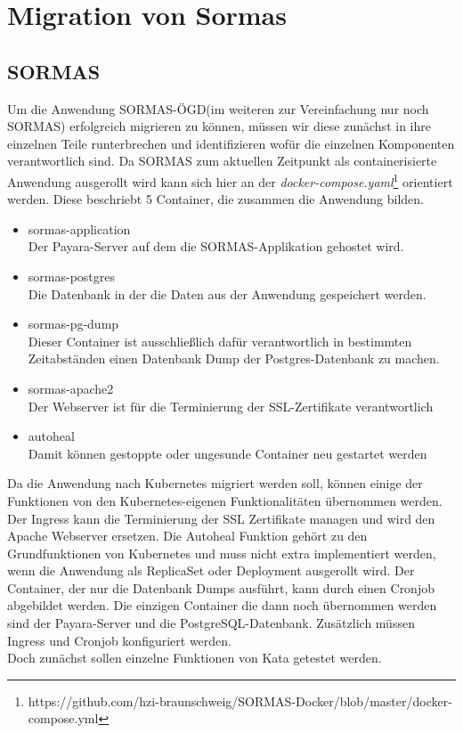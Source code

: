 \chapter{Migration von Sormas}

\section{SORMAS}
\label{ref:sormas_strucure}
Um die Anwendung \ac{SORMAS-ÖGD}(im weiteren zur Vereinfachung nur noch \ac{SORMAS}) erfolgreich migrieren zu können, müssen wir diese zunächst in ihre einzelnen Teile runterbrechen und identifizieren wofür die einzelnen Komponenten verantwortlich sind.
Da \ac{SORMAS} zum aktuellen Zeitpunkt als containerisierte Anwendung ausgerollt wird kann sich hier an der \textit{docker-compose.yaml}\footnote{https://github.com/hzi-braunschweig/SORMAS-Docker/blob/master/docker-compose.yml} orientiert werden.
Diese beschriebt 5 Container, die zusammen die Anwendung bilden.
\begin{itemize}
    \item sormas-application \\ Der Payara-Server auf dem die \ac{SORMAS}-Applikation gehostet wird.
    \item sormas-postgres \\ Die Datenbank in der die Daten aus der Anwendung gespeichert werden.
    \item sormas-pg-dump \\ Dieser Container ist ausschließlich dafür verantwortlich in bestimmten Zeitabständen einen Datenbank Dump der Postgres-Datenbank zu machen.
    \item sormas-apache2 \\ Der Webserver ist für die Terminierung der \ac{SSL}-Zertifikate verantwortlich
    \item autoheal \\ Damit können gestoppte oder ungesunde Container neu gestartet werden
\end{itemize}
Da die Anwendung nach Kubernetes migriert werden soll, können einige der Funktionen von den Kubernetes-eigenen Funktionalitäten übernommen werden. 
Der Ingress kann die Terminierung der \ac{SSL} Zertifikate managen und wird den Apache Webserver ersetzen.
Die Autoheal Funktion gehört zu den Grundfunktionen von Kubernetes und muss nicht extra implementiert werden, wenn die Anwendung als ReplicaSet oder Deployment ausgerollt wird.
Der Container, der nur die Datenbank Dumps ausführt, kann durch einen Cronjob abgebildet werden. 
Die einzigen Container die dann noch übernommen werden sind der Payara-Server und die PostgreSQL-Datenbank.
Zusätzlich müssen Ingress und Cronjob konfiguriert werden. \\
Doch zunächst sollen einzelne Funktionen von Kata getestet werden.


